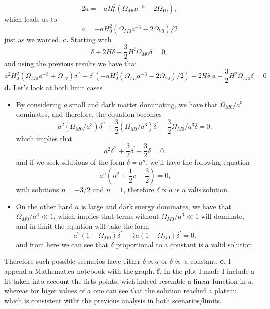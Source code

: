 \documentclass[11pt]{article}
\begin{document}
\begin{problem}
\begin{displaymath}
 2\ddot a = -aH_0^2(\Omega_{M0}a^{-3} - 2\Omega_{V0}),
\end{displaymath}
which leads us to
\begin{displaymath}
\ddot a = -aH_0^2(\Omega_{M0}a^{-3} - 2\Omega_{V0})/2
\end{displaymath}
just as we wanted.
\newline
\textbf{c.} Starting with 
\begin{displaymath}
  \ddot\delta + 2H\dot\delta - \frac{3}{2}H^2\Omega_{M0}\delta=0,
\end{displaymath}
and using the previous results we have that
\begin{displaymath}
a^2H_0^2\left(\Omega_{M0} a^{-3} + \Omega_{V0}\right) \delta^{\prime\prime} + \delta^{\prime}(-aH_0^2(\Omega_{M0}a^{-3} - 2\Omega_{V0})/2) + 2H\delta^{\prime}\dot{a} -\frac{3}{2}H^2\Omega_{M0}\delta=0
\end{displaymath}
\newline
\textbf{d.} Let's look at both limit cases
\begin{itemize}
\item By considering $a$ small and dark matter dominating, we have that $\Omega_{M0}/a^3$ dominates, and therefore, the equation becomes
\begin{displaymath}
  a^2(\Omega_{M0}/a^3)\delta^{\prime\prime}+\frac{3}{2}(\Omega_{M0}/a^3)\delta^{\prime} -\frac{3}{2}\Omega_{M0}/a^3\delta=0,
\end{displaymath}
which implies that
\begin{displaymath}
  a^2\delta^{\prime\prime} + \frac{3}{2}\delta^\prime-\frac{3}{2}\delta=0,
\end{displaymath}
and if we seek solutions of the form $\delta=a^n$, we'll have the following equation
\begin{displaymath}
  a^n(n^2+\frac{1}{2}n-\frac{3}{2})=0,
\end{displaymath}
with solutions $n=-3/2$ and $n=1$, therefore $\delta\propto a$ is a valis solution.
\item On the other hand $a$ is large and dark energy dominates, we have that $\Omega_{M0}/a^3\ll 1$, which implies that terms without $\Omega_{M0}/a^3\ll 1$ will dominate, and in limit the equation will take the form
\begin{displaymath}
 a^2(1-\Omega_{M0})\delta^{\prime\prime} + 3a(1-\Omega_{M0})\delta^{\prime}=0,
\end{displaymath}
and from here we can see that $\delta$ proportional to a constant is a valid solution.
\end{itemize}
Therefore such possible scenarios have either $\delta\propto a$ or $\delta\propto$ a constant.
\newline
\textbf{e.} I append a Mathematica notebook with the graph.
\newline
\textbf{f.} In the plot I made I include a fit taken into account the firts points, wich indeed resemble a linear function in $a$, whereas for higer values of $a$ one can see that the solution reached a plateau, which is consistent witht the previous analysis in both scenarios/limits.
\end{problem}
\end{document}
